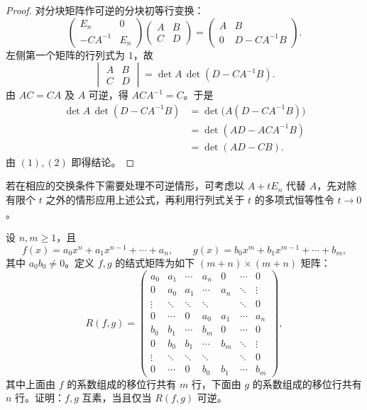 \begin{proof}
	对分块矩阵作可逆的分块初等行变换：
	\[
	\begin{pmatrix}
		E_n&0\\
		-CA^{-1}&E_n
	\end{pmatrix}
	\begin{pmatrix}
		A&B\\
		C&D
	\end{pmatrix}
	=
	\begin{pmatrix}
		A&B\\
		0&D-CA^{-1}B
	\end{pmatrix}.
	\]
	左侧第一个矩阵的行列式为 $1$，故
	\begin{equation}\tag{1}
		\begin{vmatrix}
			A&B\\
			C&D
		\end{vmatrix}
		=\det A\,\det(D-CA^{-1}B).
	\end{equation}
	由 $AC=CA$ 及 $A$ 可逆，得 $ACA^{-1}=C$。于是
	\begin{equation}\tag{2}
		\begin{aligned}
			\det A\,\det(D-CA^{-1}B)
			&=\det\bigl(A(D-CA^{-1}B)\bigr)\\
			&=\det(AD-ACA^{-1}B)\\
			&=\det(AD-CB).
		\end{aligned}
	\end{equation}
	由 $(1),(2)$ 即得结论。
\end{proof}

\begin{remark}
	若在相应的交换条件下需要处理不可逆情形，可考虑以 $A+tE_n$ 代替 $A$，先对除有限个 $t$ 之外的情形应用上述公式，再利用行列式关于 $t$ 的多项式恒等性令 $t\to0$。
\end{remark}

\begin{problem}
 设 $n,m\geq1$，且
	\[
	f(x)=a_0x^n+a_1x^{n-1}+\cdots+a_n,
	\qquad
	g(x)=b_0x^m+b_1x^{m-1}+\cdots+b_m,
	\]
	\label{p1:concept:c3-l3286}其中 $a_0b_0\neq0$。定义 $f,g$ 的结式矩阵为如下 $(m+n)\times(m+n)$ 矩阵：
	\[
	R(f,g)=
	\begin{pmatrix}
		a_0&a_1&\cdots&a_n&0&\cdots&0\\
		0&a_0&a_1&\cdots&a_n&\ddots&\vdots\\
		\vdots&\ddots&\ddots&\ddots&&\ddots&0\\
		0&\cdots&0&a_0&a_1&\cdots&a_n\\[2mm]
		b_0&b_1&\cdots&b_m&0&\cdots&0\\
		0&b_0&b_1&\cdots&b_m&\ddots&\vdots\\
		\vdots&\ddots&\ddots&\ddots&&\ddots&0\\
		0&\cdots&0&b_0&b_1&\cdots&b_m
	\end{pmatrix},
	\]
	其中上面由 $f$ 的系数组成的移位行共有 $m$ 行，下面由 $g$ 的系数组成的移位行共有 $n$ 行。证明：$f,g$ 互素，当且仅当 $R(f,g)$ 可逆。
\end{problem}

